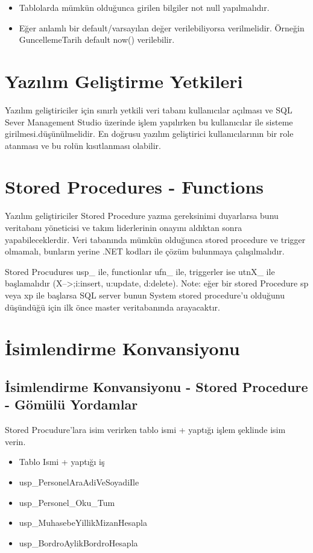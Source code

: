 \documentclass[10pt,a4paper,draft]{article}
\begin{document}
\begin{itemize}
\item   Tablolarda mümkün olduğunca girilen bilgiler not null yapılmalıdır.
\item   Eğer anlamlı bir default/varsayılan değer verilebiliyorsa verilmelidir. Örneğin GuncellemeTarih default now() verilebilir.
\end{itemize}  			
  		 
  
\section{Yazılım Geliştirme Yetkileri}  									 
Yazılım geliştiriciler için sınırlı yetkili veri tabanı kullanıcılar açılması 
ve SQL Sever Management Studio üzerinde işlem yapılırken bu 
kullanıcılar ile sisteme girilmesi.düşünülmelidir.
En doğrusu yazılım geliştirici kullanıcılarının bir role atanması ve bu rolün kısıtlanması olabilir.

  	 
\section{Stored Procedures - Functions}  									 
Yazılım geliştiriciler Stored Procedure yazma gereksinimi duyarlarsa 
bunu veritabanı yöneticisi ve takım liderlerinin onayını	aldıktan sonra   yapabileceklerdir.
Veri tabanında mümkün olduğunca stored procedure ve trigger olmamalı,
bunların yerine .NET kodları ile çözüm bulunmaya çalışılmalıdır.


Stored Procudures usp\_ ile, functionlar ufn\_ ile, triggerler ise utnX\_ ile başlamalıdır (X-->;i:insert, u:update, d:delete). 			
Note: eğer bir stored Procedure sp veya xp ile başlarsa SQL server 
bunun System stored procedure'u olduğunu düşündüğü için ilk önce master veritabanında arayacaktır. 
  
  
\section{İsimlendirme Konvansiyonu}  
  
\subsection{İsimlendirme Konvansiyonu - Stored Procedure - Gömülü Yordamlar }  

Stored Procudure'lara isim verirken tablo ismi + yaptığı işlem şeklinde  isim verin.
    

\begin{itemize}
\item Tablo Ismi + yaptığı iş 
\item usp\_PersonelAraAdiVeSoyadiIle 
\item usp\_Personel\_Oku\_Tum 
\item usp\_MuhasebeYillikMizanHesapla
\item usp\_BordroAylikBordroHesapla
\end{itemize}
\end{document}
